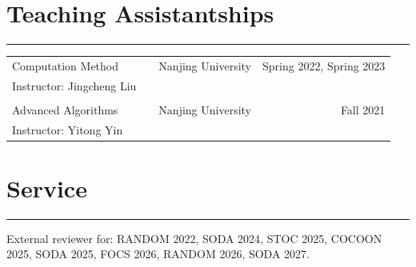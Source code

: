 \documentclass{article}
\begin{document}
\section*{Teaching Assistantships}
\vspace{-1em} \hrule \vspace{1em}

\begin{tabularx}{\textwidth}{@{\hskip 0pt}lXrr@{\hskip 0pt}}
  \large Computation Method & & Nanjing University & Spring 2022, Spring 2023 \\
  Instructor: Jingcheng Liu \\
  \\
  \large Advanced Algorithms & & Nanjing University & Fall 2021 \\ 
  Instructor: Yitong Yin
\end{tabularx}

\section*{Service}
\vspace{-1em} \hrule \vspace{1em}

External reviewer for: RANDOM 2022, SODA 2024, STOC 2025, COCOON 2025, SODA 2025, FOCS 2026, RANDOM 2026, SODA 2027.
\end{document}
